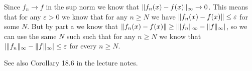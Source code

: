 \documentclass[]{article}
\DeclarePairedDelimiter\norm{\lVert}{\rVert}
\begin{document}
			

			Since $f_n \to f$ in the sup norm we know that $\norm{f_n(x) - f(x)}_\infty \to 0$. This means that for any $\varepsilon > 0$ we know that for any $n \geq N$ we have $\norm{f_n(x) - f(x)} \leq \varepsilon$ for some $N$. But by part a we know that $\norm{f_n(x) - f(x)} \geq |\norm{f_n}_\infty - \norm{f}_\infty|$, so we can use the same $N$ such such that for any $n \geq N$ we know that $|\norm{f_n}_\infty - \norm{f}_\infty| \leq \varepsilon$ for every $n \geq N$. 





			See also Corollary 18.6 in the lecture notes.
			
\end{document}
